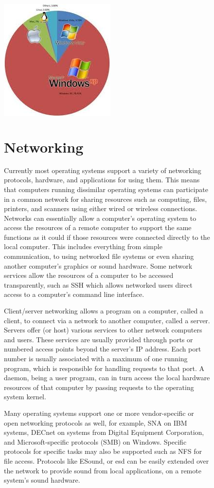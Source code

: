 \documentclass[a4paper,10pt]{article}
\begin{document}
 \begin{figure}
 \centering
 \includegraphics{op}
 
 \section{Networking}
 
 
Currently most operating systems support a variety of networking protocols, hardware, and applications for using them. This means that computers running dissimilar operating systems can participate in a common network for sharing resources such as computing, files, printers, and scanners using either wired or wireless connections. Networks can essentially allow a computer's operating system to access the resources of a remote computer to support the same functions as it could if those resources were connected directly to the local computer. This includes everything from simple communication, to using networked file systems or even sharing another computer's graphics or sound hardware. Some network services allow the resources of a computer to be accessed transparently, such as SSH which allows networked users direct access to a computer's command line interface.

Client/server networking allows a program on a computer, called a client, to connect via a network to another computer, called a server. Servers offer (or host) various services to other network computers and users. These services are usually provided through ports or numbered access points beyond the server's IP address. Each port number is usually associated with a maximum of one running program, which is responsible for handling requests to that port. A daemon, being a user program, can in turn access the local hardware resources of that computer by passing requests to the operating system kernel.

Many operating systems support one or more vendor-specific or open networking protocols as well, for example, SNA on IBM systems, DECnet on systems from Digital Equipment Corporation, and Microsoft-specific protocols (SMB) on Windows. Specific protocols for specific tasks may also be supported such as NFS for file access. Protocols like ESound, or esd can be easily extended over the network to provide sound from local applications, on a remote system's sound hardware.
 \end{figure}
\end{document}
